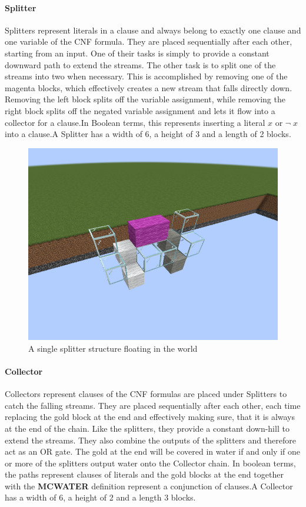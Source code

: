 \paragraph{Splitter} \label{splitter}
Splitters represent literals in a clause and always belong to  exactly one clause and one variable of the CNF formula. They are placed sequentially after each other, starting from an input. One of their tasks is simply to provide a constant downward path to extend the streams. The other task is to split one of the streams into two when necessary. This is accomplished by removing one of the magenta blocks, which effectively creates a new stream that falls directly down. Removing the left block splits off the variable assignment, while removing the right block splits off the negated variable assignment and lets it flow into a collector for a clause.\newline In Boolean terms, this represents inserting a literal $x$ or $\neg \; x$ into a clause.\newline A Splitter has a width of 6, a height of 3 and a length of 2 blocks.

\begin{figure}[h]
    \centering
    \includegraphics[width=0.5\linewidth]{images/splitter.png}
    \caption{A single splitter structure floating in the world}
    \label{fig:splitter}
\end{figure}

\pagebreak
    
\paragraph{Collector} \label{collector}
Collectors represent clauses of the CNF formulas are placed under Splitters to catch the falling streams. They are placed sequentially after each other, each time replacing the gold block at the end and effectively making sure, that it is always at the end of the chain. Like the splitters, they provide a constant down-hill to extend the streams. They also combine the outputs of the splitters and therefore act as an OR gate. The gold at the end will be covered in water if and only if one or more of the splitters output water onto the Collector chain. In boolean terms, the paths represent clauses of literals and the gold blocks at the end together with the \textbf{MCWATER} definition represent a conjunction of clauses.\newline A Collector has a width of 6, a height of 2 and a length 3 blocks.


